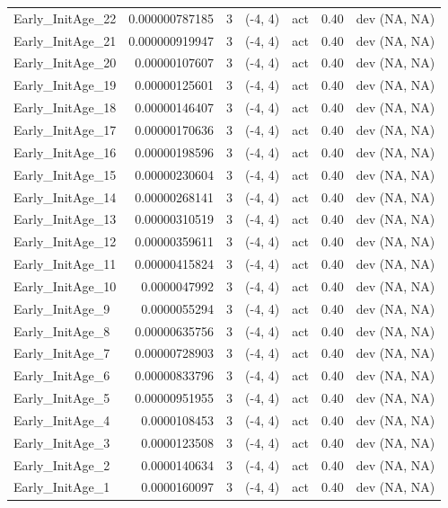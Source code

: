 \documentclass[12pt,]{article}
\begin{document}
\begin{landscape}
\begin{longtable}{lrcccll}
  Early\_InitAge\_22 & 0.000000787185 & 3 & (-4, 4) & act & 0.40 & dev (NA, NA) \\ 
  Early\_InitAge\_21 & 0.000000919947 & 3 & (-4, 4) & act & 0.40 & dev (NA, NA) \\ 
  Early\_InitAge\_20 & 0.00000107607 & 3 & (-4, 4) & act & 0.40 & dev (NA, NA) \\ 
  Early\_InitAge\_19 & 0.00000125601 & 3 & (-4, 4) & act & 0.40 & dev (NA, NA) \\ 
  Early\_InitAge\_18 & 0.00000146407 & 3 & (-4, 4) & act & 0.40 & dev (NA, NA) \\ 
  Early\_InitAge\_17 & 0.00000170636 & 3 & (-4, 4) & act & 0.40 & dev (NA, NA) \\ 
  Early\_InitAge\_16 & 0.00000198596 & 3 & (-4, 4) & act & 0.40 & dev (NA, NA) \\ 
  Early\_InitAge\_15 & 0.00000230604 & 3 & (-4, 4) & act & 0.40 & dev (NA, NA) \\ 
  Early\_InitAge\_14 & 0.00000268141 & 3 & (-4, 4) & act & 0.40 & dev (NA, NA) \\ 
  Early\_InitAge\_13 & 0.00000310519 & 3 & (-4, 4) & act & 0.40 & dev (NA, NA) \\ 
  Early\_InitAge\_12 & 0.00000359611 & 3 & (-4, 4) & act & 0.40 & dev (NA, NA) \\ 
  Early\_InitAge\_11 & 0.00000415824 & 3 & (-4, 4) & act & 0.40 & dev (NA, NA) \\ 
  Early\_InitAge\_10 & 0.0000047992 & 3 & (-4, 4) & act & 0.40 & dev (NA, NA) \\ 
  Early\_InitAge\_9 & 0.0000055294 & 3 & (-4, 4) & act & 0.40 & dev (NA, NA) \\ 
  Early\_InitAge\_8 & 0.00000635756 & 3 & (-4, 4) & act & 0.40 & dev (NA, NA) \\ 
  Early\_InitAge\_7 & 0.00000728903 & 3 & (-4, 4) & act & 0.40 & dev (NA, NA) \\ 
  Early\_InitAge\_6 & 0.00000833796 & 3 & (-4, 4) & act & 0.40 & dev (NA, NA) \\ 
  Early\_InitAge\_5 & 0.00000951955 & 3 & (-4, 4) & act & 0.40 & dev (NA, NA) \\ 
  Early\_InitAge\_4 & 0.0000108453 & 3 & (-4, 4) & act & 0.40 & dev (NA, NA) \\ 
  Early\_InitAge\_3 & 0.0000123508 & 3 & (-4, 4) & act & 0.40 & dev (NA, NA) \\ 
  Early\_InitAge\_2 & 0.0000140634 & 3 & (-4, 4) & act & 0.40 & dev (NA, NA) \\ 
  Early\_InitAge\_1 & 0.0000160097 & 3 & (-4, 4) & act & 0.40 & dev (NA, NA) \\ 

\end{longtable}
\end{landscape}
\end{document}
